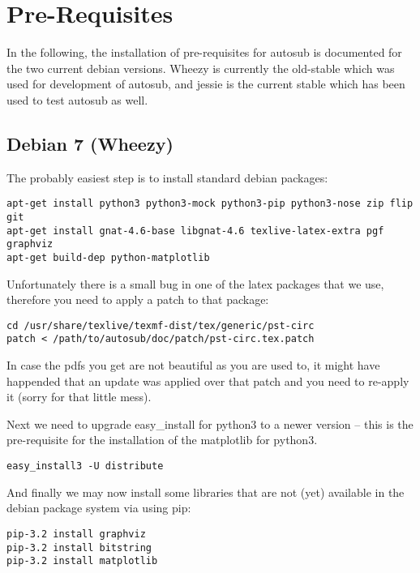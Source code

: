 \section{Pre-Requisites} \label{sec:installation}

In the following, the installation of pre-requisites for autosub is documented for 
the two current debian versions. Wheezy is currently the old-stable which was used 
for development of autosub, and jessie is the current stable which has been used to 
test autosub as well.

\subsection{Debian 7 (Wheezy)}

The probably easiest step is to install standard debian packages:

\begin{verbatim}
apt-get install python3 python3-mock python3-pip python3-nose zip flip git
apt-get install gnat-4.6-base libgnat-4.6 texlive-latex-extra pgf graphviz
apt-get build-dep python-matplotlib
\end{verbatim}

Unfortunately there is a small bug in one of the latex packages that we use,
therefore you need to apply a patch to that package:

\begin{verbatim}
cd /usr/share/texlive/texmf-dist/tex/generic/pst-circ
patch < /path/to/autosub/doc/patch/pst-circ.tex.patch
\end{verbatim}

In case the pdfs you get are not beautiful as you are used to, it might have
happended that an update was applied over that patch and you need to re-apply it (sorry for that little mess).


Next we need to upgrade easy\_install for python3 to a newer version -- this
is the pre-requisite for the installation of the matplotlib for python3.

\begin{verbatim}
easy_install3 -U distribute
\end{verbatim}

And finally we may now install some libraries that are not (yet) available in
the debian package system via using pip:

\begin{verbatim}
pip-3.2 install graphviz
pip-3.2 install bitstring
pip-3.2 install matplotlib
\end{verbatim}


